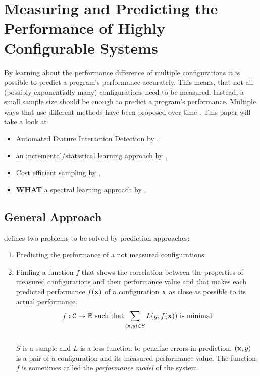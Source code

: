 \section{Measuring and Predicting the Performance of Highly Configurable Systems}\label{sec:measuring}

By learning about the performance difference of multiple configurations it is possible to predict a program's performance accurately. This means, that not all (possibly exponentially many) configurations need to be measured. Instead, a small sample size should be enough to predict a program's performance. Multiple ways that use different methods have been proposed over time \cite{FasterDiscoveryofFasterSystemConfigurationsSiegmund2017}. This paper will take a look at
\begin{itemize}
	\item \hyperref[sec:AFID]{Automated Feature Interaction Detection} by \citet{AutomatedFeatureDetectionSiegmund2012},
	\item an \hyperref[sec:VAPP]{incremental/statistical learning approach} by \citet{VariabilityAwarePerformancePredictionJianmeiSigmundApel},
	\item \hyperref[sec:CESampling]{Cost efficient sampling by \citet{CostEfficientSampling_Gou_Siegmund_2015}},
	\item \hyperref[sec:WHAT]{\textbf{WHAT}} a spectral learning approach by \citet{FasterDiscoveryofFasterSystemConfigurationsSiegmund2017},
\end{itemize}

\subsection{General Approach}

\citet{VariabilityAwarePerformancePredictionJianmeiSigmundApel} defines two problems to be solved by prediction approaches:
\begin{enumerate}
	\item Predicting the performance of a not measured configurations.
	\item Finding a function $f$ that shows the correlation between the properties of measured configurations and their performance value and that makes each predicted performance $f(\mathrm{\mathbf{x}})$ of a configuration $\mathrm{\mathbf{x}}$ as close as possible to its actual performance.\\	
	\begin{equation}
	f : \mathcal{C} \rightarrow  \mathbb{R} \text{ such that} \sum_{(\mathrm{\mathbf{x}},y) \in S} L(y,f(\mathrm{\mathbf{x}})) \text{ is minimal}
	\end{equation}\\
	$S$ is a sample and	$L$ is a loss function to penalize errors in prediction. $(\mathrm{\mathbf{x}},y)$ is a pair of a configuration and its measured performance value. The function $f$ is sometimes called the \textit{performance model} of the system.
\end{enumerate}

